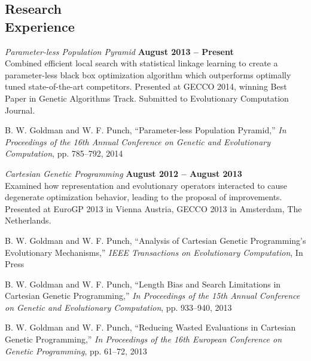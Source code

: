 \documentclass[margin,line]{resume}
\begin{document}
\begin{resume}
    \section{\mysidestyle Research\\Experience}
    \textsl{Parameter-less Population Pyramid} \hfill \textbf{August 2013 -- Present}\\
    Combined efficient local search with statistical linkage learning to create a
    parameter-less black box optimization algorithm which outperforms optimally tuned
    state-of-the-art competitors. Presented at GECCO 2014, winning Best Paper in Genetic
    Algorithms Track. Submitted to Evolutionary Computation Journal.
    
    \vspace{-2mm}
    B. W. Goldman and W. F. Punch,
    ``Parameter-less Population Pyramid,''
    \textsl{In Proceedings of the 16th Annual Conference on Genetic and Evolutionary Computation}, pp. 785--792, 2014
        
    \textsl{Cartesian Genetic Programming} \hfill \textbf{August 2012 -- August 2013}\\
    Examined how representation and evolutionary operators interacted to cause degenerate
    optimization behavior, leading to the proposal of improvements.  Presented at EuroGP 2013
    in Vienna Austria, GECCO 2013 in Amsterdam, The Netherlands.
    
    \vspace{-2mm}
    B. W. Goldman and W. F. Punch,
    ``Analysis of Cartesian Genetic Programming's Evolutionary Mechanisms,''
    \textsl{IEEE Transactions on Evolutionary Computation}, In Press
    
    \vspace{-2mm}
    B. W. Goldman and W. F. Punch,
    ``Length Bias and Search Limitations in Cartesian Genetic Programming,''
    \textsl{In Proceedings of the 15th Annual Conference on Genetic and Evolutionary Computation}, pp. 933--940, 2013

    \vspace{-2mm}
    B. W. Goldman and W. F. Punch,
    ``Reducing Wasted Evaluations in  Cartesian Genetic Programming,''
    \textsl{In Proceedings of the 16th European Conference on Genetic Programming}, pp. 61--72, 2013


\end{resume}
\end{document}
